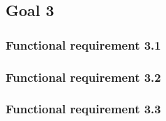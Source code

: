 \subsection{Goal 3}

\setcounter{secnumdepth}{3}
\subsubsection{Functional requirement 3.1}

\subsubsection{Functional requirement 3.2}

\subsubsection{Functional requirement 3.3}
